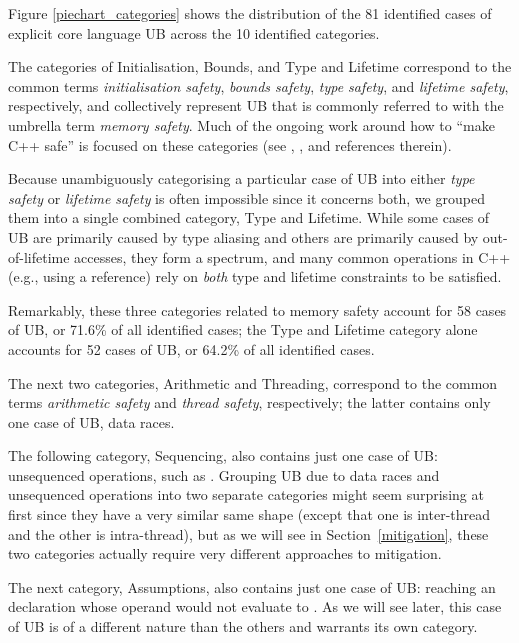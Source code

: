 Figure \ref{piechart_categories} shows the distribution of the 81 identified cases of explicit core language UB across the 10 identified categories. 



The categories of Initialisation, Bounds, and Type and Lifetime correspond to the common terms \emph{initialisation safety}, \emph{bounds safety}, \emph{type safety},  and \emph{lifetime safety}, respectively, and collectively represent UB that is commonly referred to with the umbrella term \emph{memory safety}. Much of the ongoing work around how to ``make C++ safe'' is focused on these  categories (see \cite{P3081R2}, \cite{P3700R0}, and references therein).

Because unambiguously categorising a particular case of UB into either \emph{type safety} or \emph{lifetime safety} is often impossible since it concerns both, we grouped them into a single combined category, Type and Lifetime. While some cases of UB are primarily caused by type aliasing and others are primarily caused by out-of-lifetime accesses, they form a spectrum, and many common operations in C++ (e.g., using a reference) rely on \emph{both} type and lifetime constraints to be satisfied.

Remarkably, these three categories related to memory safety account for 58 cases of UB, or 71.6\% of all identified cases; the Type and Lifetime category alone accounts for 52 cases of UB, or 64.2\% of all identified cases.

The next two categories, Arithmetic and Threading, correspond to the common terms \emph{arithmetic safety} and \emph{thread safety}, respectively; the latter contains only one case of UB, data races.

The following category, Sequencing, also contains just one case of UB: unsequenced operations, such as \mbox{}. Grouping UB due to data races and unsequenced operations into two separate categories might seem surprising at first since they have a very similar same shape (except that one is inter-thread and the other is intra-thread), but as we will see in Section~\ref{mitigation}, these two categories actually require very different approaches to mitigation.

The next category, Assumptions, also contains just one case of UB: reaching an \tcode{[[assume]]} declaration whose operand would not evaluate to . As we will see later, this case of UB is of a different nature than the others and warrants its own category.

